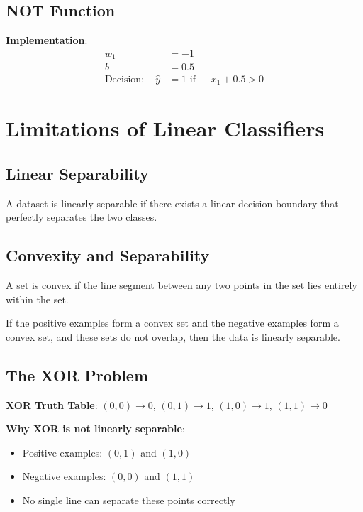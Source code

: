 \subsection{NOT Function}
\textbf{Implementation}:
\begin{align}
w_1 &= -1 \\
b &= 0.5 \\
\text{Decision}: \quad \hat{y} &= 1 \text{ if } -x_1 + 0.5 > 0
\end{align}

\section{Limitations of Linear Classifiers}

\subsection{Linear Separability}

\begin{definition}
A dataset is linearly separable if there exists a linear decision boundary that perfectly separates the two classes.
\end{definition}

\subsection{Convexity and Separability}

\begin{definition}
A set is convex if the line segment between any two points in the set lies entirely within the set.
\end{definition}

\begin{theorem}
If the positive examples form a convex set and the negative examples form a convex set, and these sets do not overlap, then the data is linearly separable.
\end{theorem}

\subsection{The XOR Problem}

\textbf{XOR Truth Table}: $(0,0) \rightarrow 0$, $(0,1) \rightarrow 1$, $(1,0) \rightarrow 1$, $(1,1) \rightarrow 0$

\textbf{Why XOR is not linearly separable}:
\begin{itemize}
    \item Positive examples: $(0,1)$ and $(1,0)$
    \item Negative examples: $(0,0)$ and $(1,1)$
    \item No single line can separate these points correctly
\end{itemize}

